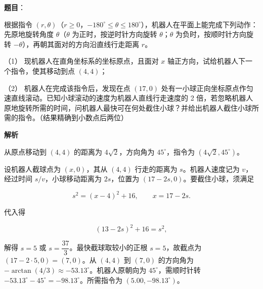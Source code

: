\begin{answer}

\textbf{题目}：

根据指令 $(r,\theta)$（$r\geq 0$，$-180^\circ\leq\theta\leq180^\circ$），机器人在平面上能完成下列动作：先原地旋转角度 $\theta$（$\theta$ 为正时，按逆时针方向旋转 $\theta$；$\theta$ 为负时，按顺时针方向旋转 $-\theta$），再朝其面对的方向沿直线行走距离 $r$。

（1） 现机器人在直角坐标系的坐标原点，且面对 $x$ 轴正方向，试给机器人下一个指令，使其移动到点 $(4,4)$；

（2） 机器人在完成该指令后，发现在点 $(17,0)$ 处有一小球正向坐标原点作匀速直线滚动。已知小球滚动的速度为机器人直线行走速度的 2 倍，若忽略机器人原地旋转所需的时间，问机器人最快可在何处截住小球？并给出机器人截住小球所需的指令。（结果精确到小数点后两位）
\nopagebreak[4]
\begin{center}\end{center}
\nopagebreak[4]
\textbf{解析}

从原点移动到 $(4,4)$ 的距离为 $4\sqrt2$，方向角为 $45^\circ$，指令为 $(4\sqrt2,45^\circ)$。

设机器人截球点为 $(x,0)$，其从 $(4,4)$ 行走的距离为 $s$。机器人速度记为 $v$，经过时间 $s/v$，小球移动距离为 $2s$，位置为 $(17-2s,0)$。要截住小球，须满足

\nopagebreak[4]
\[
s^2=(x-4)^2+16,\qquad x=17-2s.
\]

代入得

\nopagebreak[4]
\[
(13-2s)^2+16=s^2,
\]

解得 $s=5$ 或 $s=\dfrac{37}{3}$。最快截球取较小的正根 $s=5$，故截点为 $(17-2\cdot5,0)=(7,0)$。从 $(4,4)$ 到 $(7,0)$ 的方向角为 $-\arctan(4/3)\approx-53.13^\circ$。机器人原朝向为 $45^\circ$，需顺时针转 $-53.13^\circ-45^\circ=-98.13^\circ$。所需指令为 $(5.00,-98.13^\circ)$。



\end{answer}
